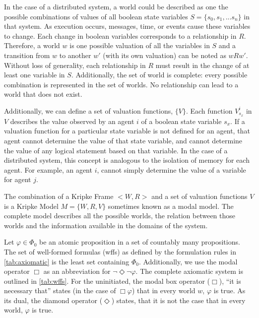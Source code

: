 In the case of a distributed system, a world could be described as one the possible combinations of values of all boolean state variables $S=\{s_0, s_1, ... s_n\}$ in that system. As execution occurs, messages, time, or events cause these variables to change. Each change in boolean variables corresponds to a relationship in $R$\cite{Gehrke200565}. Therefore, a world $w$ is one possible valuation of all the variables in $S$ and a transition from $w$ to another $w'$ (with its own valuation) can be noted as $wRw'$. Without loss of generality, each relationship in $R$ must result in the change of at least one variable in $S$. Additionally, the set of world is complete: every possible combination is represented in the set of worlds. No relationship can lead to a world that does not exist.

Additionally, we can define a set of valuation functions, $\{V\}$. Each function $V^i_{s_x}$ in $V$ describes the value observed by an agent $i$ of a boolean state variable $s_x$.  If a valuation function for a particular state variable is not defined for an agent, that agent cannot determine the value of that state variable, and cannot determine the value of any logical statement based on that variable. In the case of a distributed system, this concept is analogous to the isolation of memory for each agent. For example, an agent $i$, cannot simply determine the value of a variable for agent $j$.

The combination of a Kripke Frame $< W,R >$ and a set of valuation functions ${V}$ is a Kripke Model $M = \{W, R, V\}$ sometimes known as a modal model. The complete model describes all the possible worlds, the relation between those worlds and the information available in the domains of the system.

Let $\varphi \in \Phi_0$ be an atomic proposition in a set of countably many propositions. The set of well-formed formulas (wffs) as defined by the formulation rules in \ref{tab:axiomatic} is the least set containing $\Phi_0$. Additionally, we use the modal operator $\Box$ as an abbreviation for $\neg \Diamond \neg \varphi$. The complete axiomatic system is outlined in \ref{tab:wffs}. For the uninitiated, the modal box operator ($\Box$), ``it is necessary that'' states (in the case of $\Box \varphi$) that in every world $w$, $\varphi$ is true. As its dual, the diamond operator ($\Diamond$) states, that it is not the case that in every world, $\varphi$ is true.

